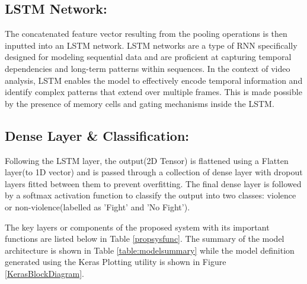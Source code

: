 \subsection{LSTM Network:}

\noindent The concatenated feature vector resulting from the pooling operations is then inputted into an LSTM network. LSTM networks are a type of RNN specifically designed for modeling sequential data and are proficient at capturing temporal dependencies and long-term patterns within sequences. In the context of video analysis, LSTM enables the model to effectively encode temporal information and identify complex patterns that extend over multiple frames. This is made possible by the presence of memory cells and gating mechanisms inside the LSTM. 

\subsection{Dense Layer \& Classification:}
Following the LSTM layer, the output(2D Tensor) is flattened using a Flatten layer(to 1D vector) and is passed through a collection of dense layer with dropout layers fitted between them to prevent overfitting. The final dense layer is followed by a softmax activation function to classify the output into two classes: violence or non-violence(labelled as 'Fight' and 'No Fight').

\noindent The key layers or components of the proposed system with its important functions are listed below in Table \ref{propsysfunc}. The summary of the model architecture is shown in Table \ref{table:modelsummary} while the model definition generated using the Keras Plotting utility is shown in Figure \ref{KerasBlockDiagram}.

\clearpage

